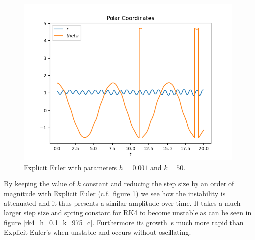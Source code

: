 \documentclass{report}
\newcounter{constant}
\begin{document}
\begin{figure}
\vspace*{-0.8cm}
\raggedleft
\begin{minipage}[b]{0.45\textwidth}
\centering
\includegraphics[width=\textwidth]{../Plots/ExpEuler/exp_euler_k=50_h=0.001_c}
\caption{Explicit Euler with parameters $h=0.001$ and $k=50$.}
\label{exp_euler_k=50_h=0.001_c_2}
\end{minipage}
\end{figure}
	
By keeping the value of $k$ constant and reducing the step size by an order of magnitude with Explicit Euler (c.f.\ figure \ref{exp_euler_k=50_h=0.001_c_2}) we see how the instability is attenuated and it thus presents a similar amplitude over time.
It takes a much larger step size and spring constant for RK4 to become unstable as can be seen in figure \ref{rk4_h=0.1_k=975_c}. Furthermore its growth is much more rapid than Explicit Euler’s when unstable and occurs without oscillating.
\end{document}
